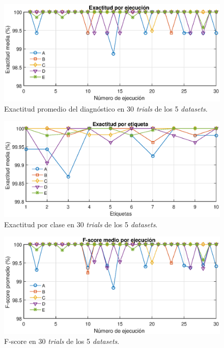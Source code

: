 \documentclass[a4paper,12pt]{article}
\begin{document}
\begin{figure}[ht]
  \centering
    \includegraphics[scale=0.9]{./AccG.eps}
  \caption{Exactitud promedio del diagnóstico en 30 \textit{trials} de los 5 \textit{datasets}.}
  \label{fig:exg}
\end{figure}

\begin{figure}[ht]
  \centering
    \includegraphics[scale=0.9]{./Acc.eps}
  \caption{Exactitud por clase en 30 \textit{trials} de los 5 \textit{datasets}.}
  \label{fig:exact}
\end{figure}

\begin{figure}[ht]
  \centering
    \includegraphics[scale=0.9]{./FscG.eps}
  \caption{F-score en 30 \textit{trials} de los 5 \textit{datasets}.}
  \label{fig:fscG}
\end{figure}
\end{document}
